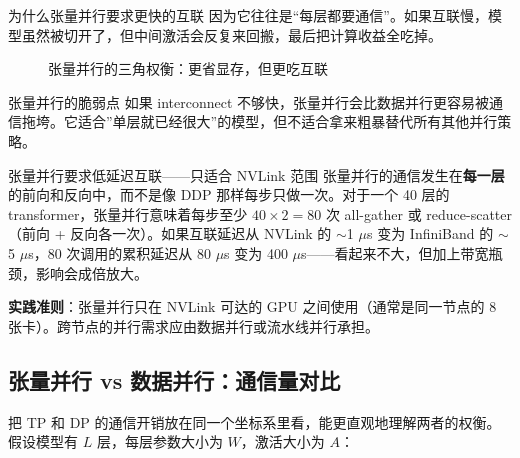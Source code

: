 \begin{importantbox}{为什么张量并行要求更快的互联}
因为它往往是“每层都要通信”。如果互联慢，模型虽然被切开了，但中间激活会反复来回搬，最后把计算收益全吃掉。
\end{importantbox}

\begin{figure}[H]
\centering
{}
\caption{张量并行的三角权衡：更省显存，但更吃互联}
\end{figure}

\begin{warningbox}{张量并行的脆弱点}
如果 interconnect 不够快，张量并行会比数据并行更容易被通信拖垮。它适合”单层就已经很大”的模型，但不适合拿来粗暴替代所有其他并行策略。
\end{warningbox}

\begin{warningbox}{张量并行要求低延迟互联——只适合 NVLink 范围}
张量并行的通信发生在\textbf{每一层}的前向和反向中，而不是像 DDP 那样每步只做一次。对于一个 40 层的 transformer，张量并行意味着每步至少 $40 \times 2 = 80$ 次 all-gather 或 reduce-scatter（前向 + 反向各一次）。如果互联延迟从 NVLink 的 $\sim$1 $\mu$s 变为 InfiniBand 的 $\sim$5 $\mu$s，80 次调用的累积延迟从 80 $\mu$s 变为 400 $\mu$s——看起来不大，但加上带宽瓶颈，影响会成倍放大。

\textbf{实践准则}：张量并行只在 NVLink 可达的 GPU 之间使用（通常是同一节点的 8 张卡）。跨节点的并行需求应由数据并行或流水线并行承担。
\end{warningbox}

\subsection{张量并行 vs 数据并行：通信量对比}

把 TP 和 DP 的通信开销放在同一个坐标系里看，能更直观地理解两者的权衡。假设模型有 $L$ 层，每层参数大小为 $W$，激活大小为 $A$：

